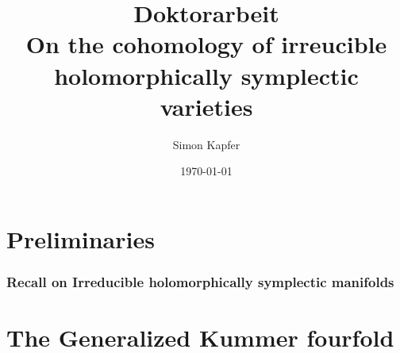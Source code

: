 \documentclass[a4paper]{article}
\begin{document}
\title{\bf Doktorarbeit\\On the cohomology of irreucible holomorphically symplectic varieties}


\author{Simon Kapfer}


\date{\today}

\maketitle
\tableofcontents

\part{Preliminaries}





\section{Recall on Irreducible holomorphically symplectic manifolds}


\part{The Generalized Kummer fourfold}\label{integralcohomology}






\appendix
%


\end{document}
